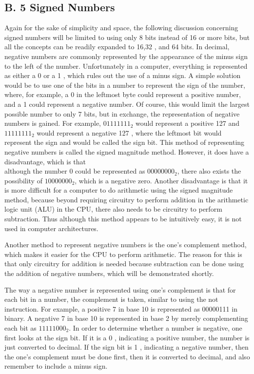 \documentclass[10pt]{book}
\begin{document}
\begin{center}
\begin{center}
\begin{center}
\begin{center}
\begin{center}
\section*{B. 5 Signed Numbers}
Again for the sake of simplicity and space, the following discussion concerning signed numbers will be limited to using only 8 bits instead of 16 or more bits, but all the concepts can be readily expanded to 16,32 , and 64 bits. In decimal, negative numbers are commonly represented by the appearance of the minus sign to the left of the number. Unfortunately in a computer, everything is represented as either a 0 or a 1 , which rules out the use of a minus sign. A simple solution would be to use one of the bits in a number to represent the sign of the number, where, for example, a 0 in the leftmost byte could represent a positive number, and a 1 could represent a negative number. Of course, this would limit the largest possible number to only 7 bits, but in exchange, the representation of negative numbers is gained. For example, $01111111_{2}$ would represent a positive 127 and $11111111_{2}$ would represent a negative 127 , where the leftmost bit would represent the sign and would be called the sign bit. This method of representing negative numbers is called the signed magnitude method. However, it does have a disadvantage, which is that\\
although the number 0 could be represented as $00000000_{2}$, there also exists the possibility of $10000000_{2}$, which is a negative zero. Another disadvantage is that it is more difficult for a computer to do arithmetic using the signed magnitude method, because beyond requiring circuitry to perform addition in the arithmetic logic unit (ALU) in the CPU, there also needs to be circuitry to perform subtraction. Thus although this method appears to be intuitively easy, it is not used in computer architectures.

Another method to represent negative numbers is the one's complement method, which makes it easier for the CPU to perform arithmetic. The reason for this is that only circuitry for addition is needed because subtraction can be done using the addition of negative numbers, which will be demonstrated shortly.

The way a negative number is represented using one's complement is that for each bit in a number, the complement is taken, similar to using the not instruction. For example, a positive 7 in base 10 is represented as 00000111 in binary. A negative 7 in base 10 is represented in base 2 by merely complementing each bit as $11111000_{2}$. In order to determine whether a number is negative, one first looks at the sign bit. If it is a 0 , indicating a positive number, the number is just converted to decimal. If the sign bit is 1 , indicating a negative number, then the one's complement must be done first, then it is converted to decimal, and also remember to include a minus sign.


\end{center}
\end{center}
\end{center}
\end{center}
\end{center}
\end{document}
